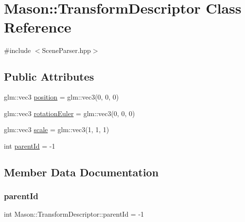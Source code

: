 \hypertarget{class_mason_1_1_transform_descriptor}{}\section{Mason\+:\+:Transform\+Descriptor Class Reference}
\label{class_mason_1_1_transform_descriptor}


{\ttfamily \#include $<$Scene\+Parser.\+hpp$>$}

\subsection*{Public Attributes}
\begin{DoxyCompactItemize}
\item 
glm\+::vec3 \hyperlink{class_mason_1_1_transform_descriptor_acce622c3f89ae5b081c61feabc1319bf}{position} = glm\+::vec3(0, 0, 0)
\item 
glm\+::vec3 \hyperlink{class_mason_1_1_transform_descriptor_aa66cc703fd520b19b4347b390eabfc41}{rotation\+Euler} = glm\+::vec3(0, 0, 0)
\item 
glm\+::vec3 \hyperlink{class_mason_1_1_transform_descriptor_a5d264880a0c22c624c996057bf59b752}{scale} = glm\+::vec3(1, 1, 1)
\item 
int \hyperlink{class_mason_1_1_transform_descriptor_ae83bf1f16969979cb24e2ae9d1eb3134}{parent\+Id} = -\/1
\end{DoxyCompactItemize}


\subsection{Member Data Documentation}
\hypertarget{class_mason_1_1_transform_descriptor_ae83bf1f16969979cb24e2ae9d1eb3134}{}\label{class_mason_1_1_transform_descriptor_ae83bf1f16969979cb24e2ae9d1eb3134} 
\subsubsection{\texorpdfstring{parent\+Id}{parentId}}
{\footnotesize\ttfamily int Mason\+::\+Transform\+Descriptor\+::parent\+Id = -\/1}

\hypertarget{class_mason_1_1_transform_descriptor_acce622c3f89ae5b081c61feabc1319bf}{}\label{class_mason_1_1_transform_descriptor_acce622c3f89ae5b081c61feabc1319bf} 
